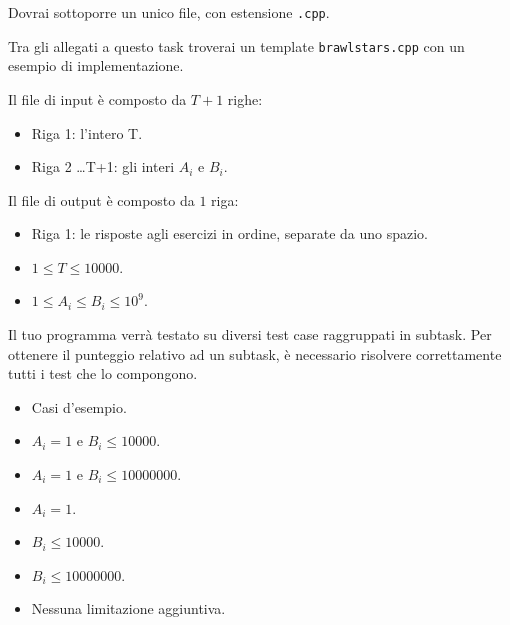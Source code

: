\Implementation

Dovrai sottoporre un unico file, con estensione \texttt{.cpp}.

\begin{warning}
    Tra gli allegati a questo task troverai un template \texttt{brawlstars.cpp} con un esempio di implementazione.
\end{warning}

Il file di input è composto da $T+1$ righe:
\begin{itemize}
    \item Riga 1: l'intero T.
    \item Riga 2 \dots T+1: gli interi $A_i$ e $B_i$.
\end{itemize}

Il file di output è composto da $1$ riga:
\begin{itemize}
    \item Riga 1: le risposte agli esercizi in ordine, separate da uno spazio.
\end{itemize}


\Constraints

\begin{itemize}[nolistsep, itemsep=2mm]
    \item $1 \le T \le 10000$.
    \item $1 \leq A_i \leq B_i \leq 10^9$.
\end{itemize}


\Scoring

Il tuo programma verrà testato su diversi test case raggruppati in subtask.
Per ottenere il punteggio relativo ad un subtask,
è necessario risolvere correttamente tutti i test che lo compongono.

\begin{itemize}[nolistsep,itemsep=2mm]
    \item \subtask Casi d'esempio.
    \item \subtask $A_i = 1$ e $B_i \leq 10000$.
    \item \subtask $A_i = 1$ e $B_i \leq 10000000$.
    \item \subtask $A_i = 1$.
    \item \subtask $B_i \leq 10000$.
    \item \subtask $B_i \leq 10000000$.
    \item \subtask Nessuna limitazione aggiuntiva.
\end{itemize}

